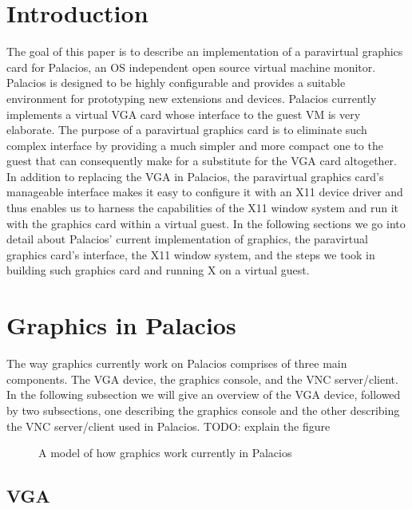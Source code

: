 \documentclass{acm_proc_article-sp}
\begin{document}
\section{Introduction}
The goal of this paper is to describe an implementation of a paravirtual
graphics card for Palacios, an OS independent open source virtual machine
monitor. \cite{Lange: Technical} Palacios is designed to be 
highly configurable and provides a suitable environment
for prototyping new extensions and devices. Palacios currently implements
  a virtual VGA card whose interface to the guest VM is very elaborate. The
  purpose of a paravirtual graphics card is to eliminate such complex interface
  by providing a much simpler and more compact one to the guest that can
  consequently make for a substitute for the VGA card altogether. In addition to
  replacing the VGA in Palacios, the paravirtual graphics card's manageable
  interface makes it easy to configure it with an X11 device driver and thus
  enables us to harness the capabilities of the X11 window system and run it with the
  graphics card within a virtual guest. In the following sections we go into
  detail about Palacios' current implementation of graphics, the paravirtual
  graphics card's interface, the X11 window system, and the steps we took in
  building such graphics card and running X on a virtual guest.

\section{Graphics in Palacios}
The way graphics currently work on Palacios comprises of three main components.
The VGA device, the graphics console, and the VNC server/client. In the
following subsection we will give an overview of the VGA device, followed by two
subsections, one describing the graphics console and the other describing the
VNC server/client used in Palacios.
 TODO: explain the figure
\begin{figure}[h]                                              
\centering                                                 
{}                                      
\caption{A model of how graphics work currently in Palacios}   
\end{figure}                                               

\subsection{VGA}
\end{document}
